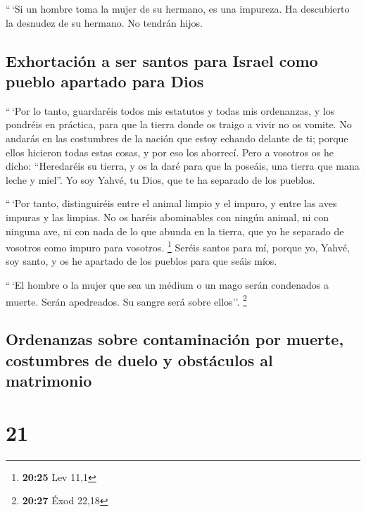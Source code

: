  ``\,`Si un hombre toma la mujer de su hermano, es una
impureza. Ha descubierto la desnudez de su hermano. No tendrán hijos.

\hypertarget{exhortaciuxf3n-a-ser-santos-para-israel-como-pueblo-apartado-para-dios}{%
\subsection{Exhortación a ser santos para Israel como pueblo apartado
para
Dios}\label{exhortaciuxf3n-a-ser-santos-para-israel-como-pueblo-apartado-para-dios}}

 ``\,`Por lo tanto, guardaréis todos mis estatutos y
todas mis ordenanzas, y los pondréis en práctica, para que la tierra
donde os traigo a vivir no os vomite.  No andarás en las
costumbres de la nación que estoy echando delante de ti; porque ellos
hicieron todas estas cosas, y por eso los aborrecí.  Pero
a vosotros os he dicho: ``Heredaréis su tierra, y os la daré para que la
poseáis, una tierra que mana leche y miel''. Yo soy Yahvé, tu Dios, que
te ha separado de los pueblos.

 ``\,`Por tanto, distinguiréis entre el animal limpio y
el impuro, y entre las aves impuras y las limpias. No os haréis
abominables con ningún animal, ni con ninguna ave, ni con nada de lo que
abunda en la tierra, que yo he separado de vosotros como impuro para
vosotros. \footnote{\textbf{20:25} Lev 11,1}  Seréis
santos para mí, porque yo, Yahvé, soy santo, y os he apartado de los
pueblos para que seáis míos.

 ``\,`El hombre o la mujer que sea un médium o un mago
serán condenados a muerte. Serán apedreados. Su sangre será sobre
ellos''. \footnote{\textbf{20:27} Éxod 22,18}

\hypertarget{ordenanzas-sobre-contaminaciuxf3n-por-muerte-costumbres-de-duelo-y-obstuxe1culos-al-matrimonio}{%
\subsection{Ordenanzas sobre contaminación por muerte, costumbres de
duelo y obstáculos al
matrimonio}\label{ordenanzas-sobre-contaminaciuxf3n-por-muerte-costumbres-de-duelo-y-obstuxe1culos-al-matrimonio}}

\hypertarget{section-20}{%
\section{21}\label{section-20}}

